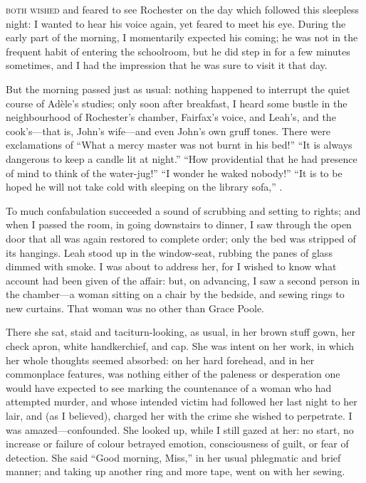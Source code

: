 
 \textsc{both wished} and feared to see \Mr{} Rochester on the day which followed
this sleepless night: I wanted to hear his voice again, yet feared to
meet his eye.  During the early part of the morning, I momentarily
expected his coming; he was not in the frequent habit of entering the
schoolroom, but he did step in for a few minutes sometimes, and I had
the impression that he was sure to visit it that day.

But the morning passed just as usual: nothing happened to interrupt the
quiet course of Adèle's studies; only soon after breakfast, I heard some
bustle in the neighbourhood of \Mr{} Rochester's chamber, \Mrs{} Fairfax's
voice, and Leah's, and the cook's---that is, John's wife---and even
John's own gruff tones.  There were exclamations of \enquote{What a
	mercy master was not burnt in his bed!}  \enquote{It is always dangerous
	to keep a candle lit at night.}  \enquote{How providential that he had
	presence of mind to think of the water-jug!}  \enquote{I wonder he waked
	nobody!}  \enquote{It is to be hoped he will not take cold with sleeping
	on the library sofa,} \etc.

To much confabulation succeeded a sound of scrubbing and setting to
rights; and when I passed the room, in going downstairs to dinner, I saw
through the open door that all was again restored to complete order;
only the bed was stripped of its hangings.  Leah stood up in the
window-seat, rubbing the panes of glass dimmed with smoke.  I was about
to address her, for I wished to know what account had been given of the
affair: but, on advancing, I saw a second person in the chamber---a
woman sitting on a chair by the bedside, and sewing rings to new
curtains.  That woman was no other than Grace Poole.

There she sat, staid and taciturn-looking, as usual, in her brown stuff
gown, her check apron, white handkerchief, and cap.  She was intent on
her work, in which her whole thoughts seemed absorbed: on her hard
forehead, and in her commonplace features, was nothing either of the
paleness or desperation one would have expected to see marking the
countenance of a woman who had attempted murder, and whose intended
victim had followed her last night to her lair, and (as I believed),
charged her with the crime she wished to perpetrate.  I was
amazed---confounded.  She looked up, while I still gazed at her: no
start, no increase or failure of colour betrayed emotion, consciousness
of guilt, or fear of detection.  She said \enquote{Good morning, Miss,}
in her usual phlegmatic and brief manner; and taking up another ring and
more tape, went on with her sewing.

